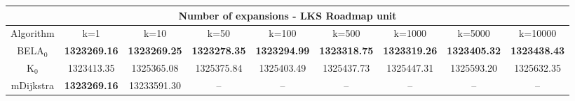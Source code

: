 \begin{tabular}{c|cccccccc}\toprule
\multicolumn{9}{c}{Number of expansions - LKS Roadmap unit}\\ \midrule
Algorithm & k=1 & k=10 & k=50 & k=100 & k=500 & k=1000 & k=5000 & k=10000 \\ \midrule
BELA$_0$ & \textbf{1323269.16} & \textbf{1323269.25} & \textbf{1323278.35} & \textbf{1323294.99} & \textbf{1323318.75} & \textbf{1323319.26} & \textbf{1323405.32} & \textbf{1323438.43} \\
K$_0$ & 1323413.35 & 1325365.08 & 1325375.84 & 1325403.49 & 1325437.73 & 1325447.31 & 1325593.20 & 1325632.35 \\
mDijkstra & \textbf{1323269.16} & 13233591.30 & -- & -- & -- & -- & -- & -- \\ \bottomrule 
\end{tabular}
